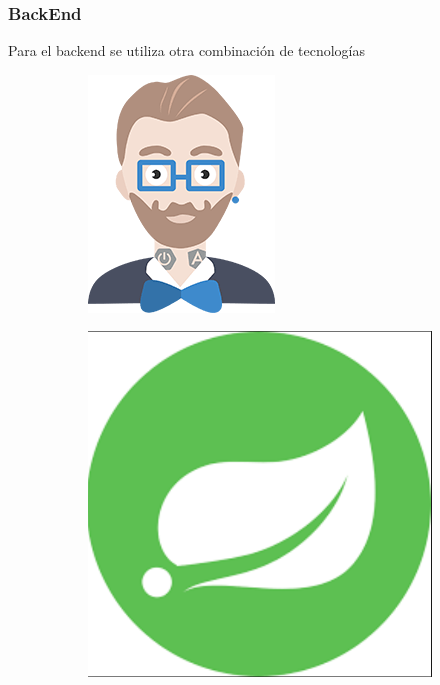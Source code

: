 \newpage
\subsubsection{BackEnd}

Para el backend se utiliza otra combinación de tecnologías

\begin{figure}[h!]
\centering
\begin{subfigure}{.1\textwidth}
  \includegraphics[width=0.5\linewidth]{Desarrollo/Arquitectura/imgs/JHipster-logo.png}
\end{subfigure}%
\begin{subfigure}{.1\textwidth}
  \includegraphics[width=0.7\linewidth]{Desarrollo/Arquitectura/imgs/spring.png}
\end{subfigure}
\begin{subfigure}{.1\textwidth}

\end{subfigure}
\end{figure}
